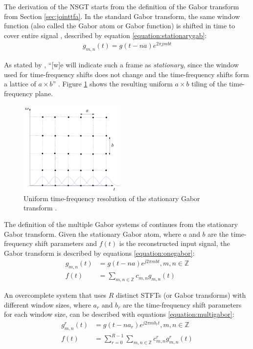 \documentclass[report.tex]{subfiles}
\begin{document}
The derivation of the NSGT starts from the definition of the Gabor transform from Section \ref{sec:jointtfa}. In the standard Gabor transform, the same window function (also called the Gabor atom or Gabor function) is shifted in time to cover entire signal \parencite{adaptivecqt}, described by equation \eqref{equation:stationarygab}:
\begin{align} \tag{11}\label{equation:stationarygab}
g_{m, n}(t) = g(t - na)e^{2\pi j m b t}
\end{align}

As stated by \citeauthor{adaptivecqt}, ``[w]e will indicate such a frame as \textit{stationary}, since the window used for time-frequency shifts does not change and the time-frequency shifts form a lattice of $a \times b$'' \parencite[3]{adaptivecqt}. Figure \ref{fig:uniformtflattice} shows the resulting uniform $a \times b$ tiling of the time-frequency plane.

\begin{figure}[ht]
	\centering
	\includegraphics[width=0.4688\textwidth]{./images-tftheory/stationarygabor.png}
	\caption{Uniform time-frequency resolution of the stationary Gabor transform \parencite[3]{adaptivecqt}.}
	\label{fig:uniformtflattice}
\end{figure}

The definition of the multiple Gabor systems of \textcite{doerflerphd} continues from the stationary Gabor transform. Given the stationary Gabor atom, where $a$ and $b$ are the time-frequency shift parameters and $f(t)$ is the reconstructed input signal, the Gabor transform is described by equations \eqref{equation:onegabor}:
\begin{align}
	\nonumber g_{m,n}(t) &= g(t - na)e^{j2\pi m b t}, m,n \in \mathbb{Z}\\
	\nonumber f(t) &= \sum_{m,n \in \mathbb{Z}}c_{m,n}g_{m,n}(t) \tag{12}\label{equation:onegabor}
\end{align}

An overcomplete system that uses $R$ distinct STFTs (or Gabor transforms) with different window sizes, where $a_{r}$ and $b_{r}$ are the time-frequency shift parameters for each window size, can be described with equations \eqref{equation:multigabor}:
\begin{align}
	\nonumber g_{m,n}^{r}(t) &= g(t - na_{r})e^{j2\pi m b_{r} t}, m,n \in \mathbb{Z}\\
	\nonumber f(t) &= \sum_{r=0}^{R-1}\sum_{m,n \in \mathbb{Z}}c^{r}_{m,n}g^{r}_{m,n}(t) \tag{13}\label{equation:multigabor}
\end{align}
\end{document}
